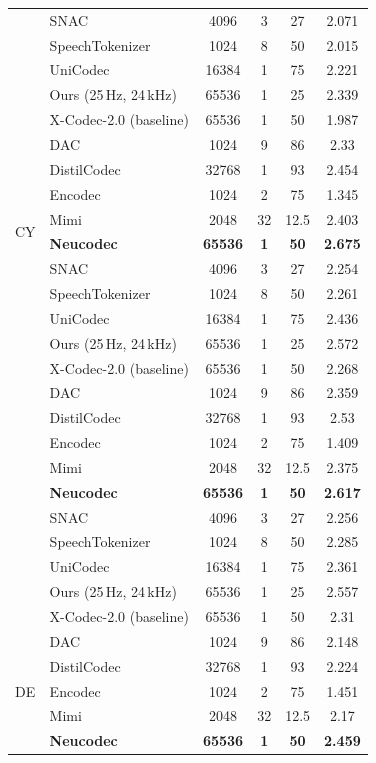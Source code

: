 \documentclass[preprint]{article}
\begin{document}
\begin{longtable}{llcccc}
  & SNAC & 4096 & 3 & 27 & 2.071 \\
  & SpeechTokenizer & 1024 & 8 & 50 & 2.015 \\
  & UniCodec & 16384 & 1 & 75 & 2.221 \\
  & Ours (25\,Hz, 24\,kHz) & 65536 & 1 & 25 & 2.339 \\
  & X-Codec-2.0 (baseline) & 65536 & 1 & 50 & 1.987 \\
\midrule
\multirow{8}{*}{CY}
  & DAC & 1024 & 9 & 86 & 2.33 \\
  & DistilCodec & 32768 & 1 & 93 & 2.454 \\
  & Encodec & 1024 & 2 & 75 & 1.345 \\
  & Mimi & 2048 & 32 & 12.5 & 2.403 \\
  & \textbf{Neucodec} & \textbf{65536} & \textbf{1} & \textbf{50} & \textbf{2.675} \\
  & SNAC & 4096 & 3 & 27 & 2.254 \\
  & SpeechTokenizer & 1024 & 8 & 50 & 2.261 \\
  & UniCodec & 16384 & 1 & 75 & 2.436 \\
  & Ours (25\,Hz, 24\,kHz) & 65536 & 1 & 25 & 2.572 \\
  & X-Codec-2.0 (baseline) & 65536 & 1 & 50 & 2.268 \\
\newpage
\multirow{8}{*}{DA}
  & DAC & 1024 & 9 & 86 & 2.359 \\
  & DistilCodec & 32768 & 1 & 93 & 2.53 \\
  & Encodec & 1024 & 2 & 75 & 1.409 \\
  & Mimi & 2048 & 32 & 12.5 & 2.375 \\
  & \textbf{Neucodec} & \textbf{65536} & \textbf{1} & \textbf{50} & \textbf{2.617} \\
  & SNAC & 4096 & 3 & 27 & 2.256 \\
  & SpeechTokenizer & 1024 & 8 & 50 & 2.285 \\
  & UniCodec & 16384 & 1 & 75 & 2.361 \\
  & Ours (25\,Hz, 24\,kHz) & 65536 & 1 & 25 & 2.557 \\
  & X-Codec-2.0 (baseline) & 65536 & 1 & 50 & 2.31 \\
\midrule
\multirow{8}{*}{DE}
  & DAC & 1024 & 9 & 86 & 2.148 \\
  & DistilCodec & 32768 & 1 & 93 & 2.224 \\
  & Encodec & 1024 & 2 & 75 & 1.451 \\
  & Mimi & 2048 & 32 & 12.5 & 2.17 \\
  & \textbf{Neucodec} & \textbf{65536} & \textbf{1} & \textbf{50} & \textbf{2.459} \\

\end{longtable}
\end{document}
